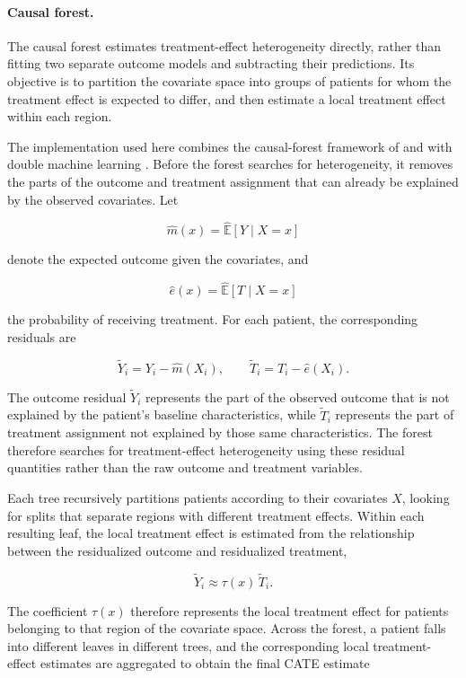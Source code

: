\paragraph{Causal forest.}

The causal forest estimates treatment-effect heterogeneity directly, rather than fitting two
separate outcome models and subtracting their predictions. Its objective is to partition the
covariate space into groups of patients for whom the treatment effect is expected to differ,
and then estimate a local treatment effect within each region.

The implementation used here combines the causal-forest framework of
\citet{wager2018} and \citet{athey2019grf} with double machine learning
\citep{kennedy2023}. Before the forest searches for heterogeneity, it removes the parts
of the outcome and treatment assignment that can already be explained by the observed
covariates. Let

\[
\hat m(x) = \widehat{\mathbb{E}}[Y \mid X=x]
\]

denote the expected outcome given the covariates, and

\[
\hat e(x) = \widehat{\mathbb{E}}[T \mid X=x]
\]

the probability of receiving treatment. For each patient, the corresponding residuals are

\[
\tilde Y_i = Y_i - \hat m(X_i), \qquad
\tilde T_i = T_i - \hat e(X_i).
\]

The outcome residual $\tilde Y_i$ represents the part of the observed outcome that is not
explained by the patient's baseline characteristics, while $\tilde T_i$ represents the part
of treatment assignment not explained by those same characteristics. The forest therefore
searches for treatment-effect heterogeneity using these residual quantities rather than the
raw outcome and treatment variables.

Each tree recursively partitions patients according to their covariates $X$, looking for
splits that separate regions with different treatment effects. Within each resulting leaf,
the local treatment effect is estimated from the relationship between the residualized
outcome and residualized treatment,

\[
\tilde Y_i \approx \tau(x)\,\tilde T_i.
\]

The coefficient $\tau(x)$ therefore represents the local treatment effect for patients
belonging to that region of the covariate space. Across the forest, a patient falls into
different leaves in different trees, and the corresponding local treatment-effect estimates
are aggregated to obtain the final CATE estimate

